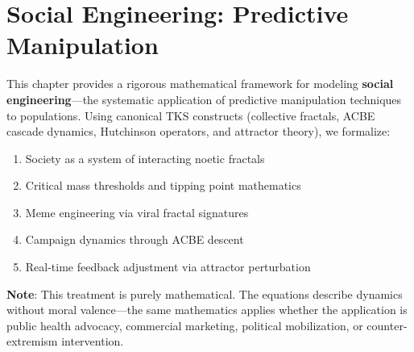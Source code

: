 

\chapter{Social Engineering: Predictive Manipulation}
\label{ch:social-engineering}

\begin{tcolorbox}[colback=blue!5!white,colframe=blue!75!black,title=\textbf{Chapter Overview},breakable]
This chapter provides a rigorous mathematical framework for modeling \textbf{social engineering}---the systematic application of predictive manipulation techniques to populations. Using canonical TKS constructs (collective fractals, ACBE cascade dynamics, Hutchinson operators, and attractor theory), we formalize:
\begin{enumerate}
    \item Society as a system of interacting noetic fractals
    \item Critical mass thresholds and tipping point mathematics
    \item Meme engineering via viral fractal signatures
    \item Campaign dynamics through ACBE descent
    \item Real-time feedback adjustment via attractor perturbation
\end{enumerate}
\textbf{Note}: This treatment is purely mathematical. The equations describe dynamics without moral valence---the same mathematics applies whether the application is public health advocacy, commercial marketing, political mobilization, or counter-extremism intervention.
\end{tcolorbox}

